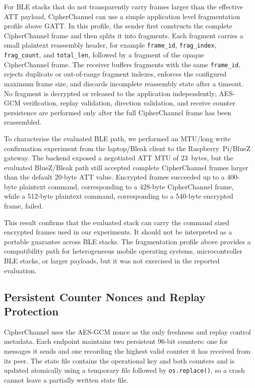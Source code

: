 \documentclass[journal]{IEEEtran}
\begin{document}
For BLE stacks that do not transparently carry frames larger than the effective ATT payload, CipherChannel can use a simple application level fragmentation profile above GATT. In this profile, the sender first constructs the complete CipherChannel frame and then splits it into fragments. Each fragment carries a small plaintext reassembly header, for example \texttt{frame\_id}, \texttt{frag\_index}, \texttt{frag\_count}, and \texttt{total\_len}, followed by a fragment of the opaque CipherChannel frame. The receiver buffers fragments with the same \texttt{frame\_id}, rejects duplicate or out-of-range fragment indexes, enforces the configured maximum frame size, and discards incomplete reassembly state after a timeout. No fragment is decrypted or released to the application independently; AES-GCM verification, replay validation, direction validation, and receive counter persistence are performed only after the full CipherChannel frame has been reassembled.

To characterise the evaluated BLE path, we performed an MTU/long write confirmation experiment from the laptop/Bleak client to the Raspberry~Pi/BlueZ gateway. The backend exposed a negotiated ATT MTU of 23~bytes, but the evaluated BlueZ/Bleak path still accepted complete CipherChannel frames larger than the default 20-byte ATT value. Encrypted frames succeeded up to a 400-byte plaintext command, corresponding to a 428-byte CipherChannel frame, while a 512-byte plaintext command, corresponding to a 540-byte encrypted frame, failed.

This result confirms that the evaluated stack can carry the command sized encrypted frames used in our experiments. It should not be interpreted as a portable guarantee across BLE stacks. The fragmentation profile above provides a compatibility path for heterogeneous mobile operating systems, microcontroller BLE stacks, or larger payloads, but it was not exercised in the reported evaluation.


\subsection{Persistent Counter Nonces and Replay Protection}
\label{sec:counternonce}

CipherChannel uses the AES-GCM nonce as the only freshness and replay control metadata. Each endpoint maintains two persistent 96-bit counters: one for messages it sends and one recording the highest valid counter it has received from its peer. The state file contains the operational key and both counters and is updated atomically using a temporary file followed by \texttt{os.replace()}, so a crash cannot leave a partially written state file.
\end{document}
